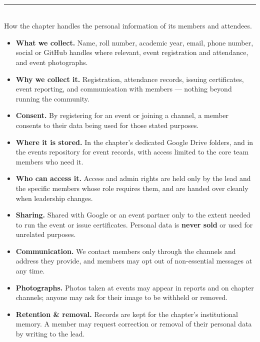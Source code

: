\documentclass[11pt,a4paper]{article}
\newcommand{\pill}[2]{\tikz[baseline]{\node[fill=#1,text=white,font=\bfseries\small,%
  rounded corners=3pt,inner xsep=7pt,inner ysep=2.5pt]{#2};}}
\begin{document}
\begin{tcolorbox}[enhanced,breakable,colback=white,colframe=Line,boxrule=0.6pt,arc=5pt,
    left=14pt,right=14pt,top=12pt,bottom=12pt,borderline west={3.5pt}{0pt}{GYel},
    before skip=8pt,after skip=12pt]
  {\pill{GYel}{03}}\;\\[8pt]
  {\color{Line}\rule{\linewidth}{0.5pt}}\\[7pt]
  
How the chapter handles the personal information of its members and attendees.
\begin{itemize}[leftmargin=1.4em,itemsep=3pt,topsep=2pt]
  \item \textbf{What we collect.} Name, roll number, academic year, email, phone number, social or
        GitHub handles where relevant, event registration and attendance, and event photographs.
  \item \textbf{Why we collect it.} Registration, attendance records, issuing certificates, event
        reporting, and communication with members — nothing beyond running the community.
  \item \textbf{Consent.} By registering for an event or joining a channel, a member consents to their
        data being used for those stated purposes.
  \item \textbf{Where it is stored.} In the chapter's dedicated Google Drive folders, and in the
        events repository for event records, with access limited to the core team members who need it.
  \item \textbf{Who can access it.} Access and admin rights are held only by the lead and the specific
        members whose role requires them, and are handed over cleanly when leadership changes.
  \item \textbf{Sharing.} Shared with Google or an event partner only to the extent needed to run the
        event or issue certificates. Personal data is \textbf{never sold} or used for unrelated
        purposes.
  \item \textbf{Communication.} We contact members only through the channels and address they provide,
        and members may opt out of non-essential messages at any time.
  \item \textbf{Photographs.} Photos taken at events may appear in reports and on chapter channels;
        anyone may ask for their image to be withheld or removed.
  \item \textbf{Retention \& removal.} Records are kept for the chapter's institutional memory. A
        member may request correction or removal of their personal data by writing to the lead.
\end{itemize}
\end{tcolorbox}
\end{document}
